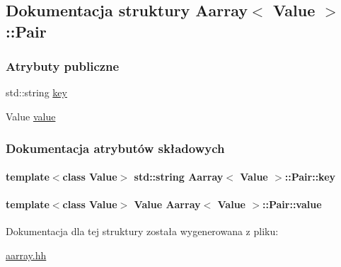 \hypertarget{struct_aarray_1_1_pair}{\subsection{Dokumentacja struktury Aarray$<$ Value $>$\-:\-:Pair}
\label{struct_aarray_1_1_pair}
}
\subsubsection*{Atrybuty publiczne}
\begin{DoxyCompactItemize}
\item 
std\-::string \hyperlink{struct_aarray_1_1_pair_ad904aed29e14bd05da2fbdb9b33e3b01}{key}
\item 
Value \hyperlink{struct_aarray_1_1_pair_a4c9a9d6df369f55036be91cd6b00f6b1}{value}
\end{DoxyCompactItemize}


\subsubsection{Dokumentacja atrybutów składowych}
\hypertarget{struct_aarray_1_1_pair_ad904aed29e14bd05da2fbdb9b33e3b01}{
\paragraph[{key}]{\setlength{\rightskip}{0pt plus 5cm}template$<$class Value$>$ std\-::string {\bf Aarray}$<$ Value $>$\-::Pair\-::key}}\label{struct_aarray_1_1_pair_ad904aed29e14bd05da2fbdb9b33e3b01}
\hypertarget{struct_aarray_1_1_pair_a4c9a9d6df369f55036be91cd6b00f6b1}{
\paragraph[{value}]{\setlength{\rightskip}{0pt plus 5cm}template$<$class Value$>$ Value {\bf Aarray}$<$ Value $>$\-::Pair\-::value}}\label{struct_aarray_1_1_pair_a4c9a9d6df369f55036be91cd6b00f6b1}


Dokumentacja dla tej struktury została wygenerowana z pliku\-:\begin{DoxyCompactItemize}
\item 
\hyperlink{aarray_8hh}{aarray.\-hh}\end{DoxyCompactItemize}
